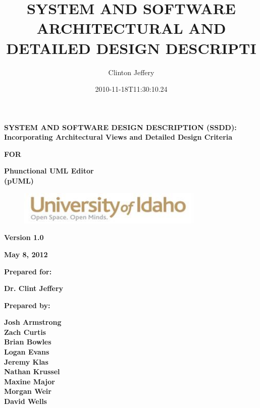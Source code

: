 \documentclass[twoside,letterpaper]{article}
\title{SYSTEM AND SOFTWARE ARCHITECTURAL AND DETAILED DESIGN DESCRIPTI}
\author{Clinton Jeffery}
\date{2010-11-18T11:30:10.24}
\begin{document}
\clearpage

{\centering{}\bfseries\color{black}
SYSTEM AND SOFTWARE DESIGN DESCRIPTION (SSDD): Incorporating
Architectural Views and Detailed Design Criteria
\par}

{\centering{}\bfseries\color{black}
FOR
\par}

\bigskip

{\centering{}\bfseries\color{black}
Phunctional UML Editor
\\(pUML)
\par}


\bigskip


\bigskip


\bigskip

\begin{figure}
\centering
\includegraphics[width=3.5in]{uidahologo.jpg}
\end{figure}

\bigskip

\bigskip

{\centering\bfseries Version 1.0 
\par}

{\centering\bfseries May 8, 2012 
\par}

\bigskip


\bigskip

{\centering\bfseries Prepared for: 
\par}

{\centering\bfseries Dr. Clint Jeffery
\par}

\bigskip


\bigskip

{\centering\bfseries Prepared by:
\par}

{\centering\bfseries
Josh Armstrong
\\Zach Curtis
\\Brian Bowles
\\Logan Evans
\\Jeremy Klas
\\Nathan Krussel
\\Maxine Major
\\Morgan Weir
\\David Wells
\par}
\end{document}
